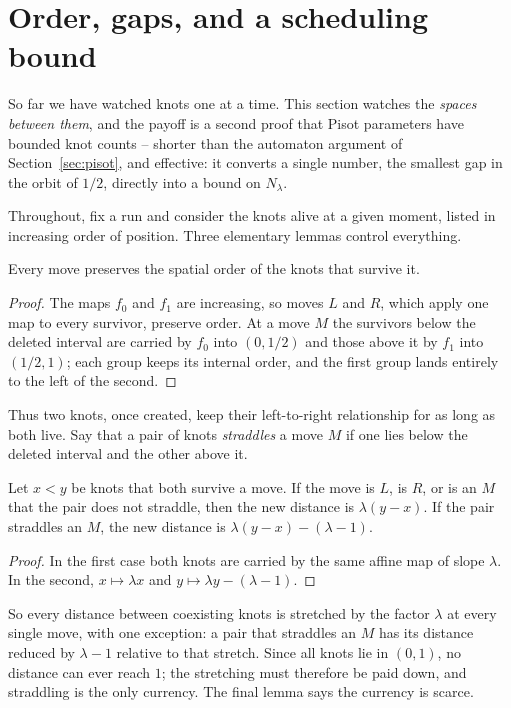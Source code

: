 \section{Order, gaps, and a scheduling bound}\label{sec:gaps}

So far we have watched knots one at a time. This section watches the
\emph{spaces between them}, and the payoff is a second proof that Pisot
parameters have bounded knot counts -- shorter than the automaton argument of
Section~\ref{sec:pisot}, and effective: it converts a single number, the
smallest gap in the orbit of $1/2$, directly into a bound on
$N_\lambda$.

Throughout, fix a run and consider the knots alive at a given moment, listed in
increasing order of position. Three elementary lemmas control everything.

\begin{lemma}[order]\label{lem:order}
Every move preserves the spatial order of the knots that survive it.
\end{lemma}

\begin{proof}
The maps $f_0$ and $f_1$ are increasing, so moves $L$ and $R$, which apply one
map to every survivor, preserve order. At a move $M$ the survivors below the
deleted interval are carried by $f_0$ into $(0,1/2)$ and those above it by
$f_1$ into $(1/2,1)$; each group keeps its internal order, and the first group
lands entirely to the left of the second.
\end{proof}

Thus two knots, once created, keep their left-to-right relationship for as long
as both live. Say that a pair of knots \emph{straddles} a move $M$ if one lies
below the deleted interval and the other above it.

\begin{lemma}\label{lem:gaplaw}
Let $x<y$ be knots that both survive a move. If the move is $L$, is $R$, or is
an $M$ that the pair does not straddle, then the new distance is
$\lambda(y-x)$. If the pair straddles an $M$, the new distance is
$\lambda(y-x)-(\lambda-1)$.
\end{lemma}

\begin{proof}
In the first case both knots are carried by the same affine map of slope
$\lambda$. In the second, $x\mapsto\lambda x$ and
$y\mapsto\lambda y-(\lambda-1)$.
\end{proof}

So every distance between coexisting knots is stretched by the factor
$\lambda$ at every single move, with one exception: a pair that straddles an
$M$ has its distance reduced by $\lambda-1$ relative to that stretch. Since
all knots lie in $(0,1)$, no distance can ever reach $1$; the stretching must
therefore be paid down, and straddling is the only currency. The final lemma
says the currency is scarce.

